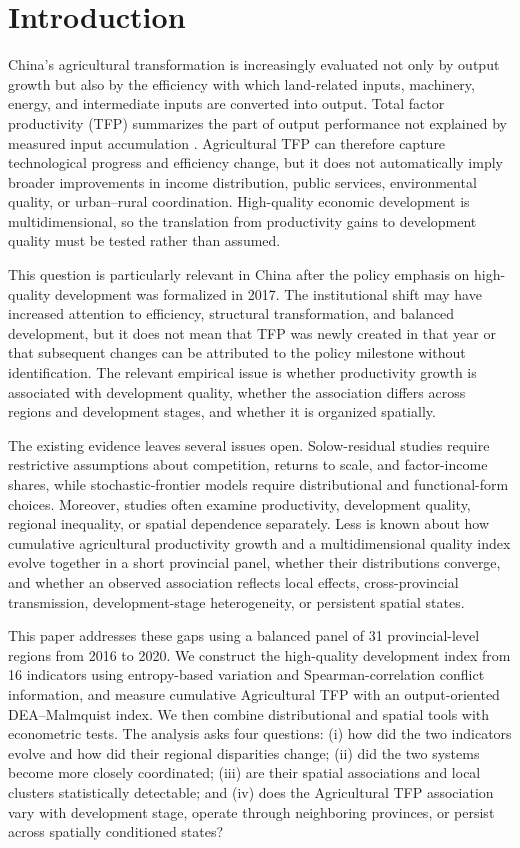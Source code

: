 \documentclass[sustainability,article,submit,moreauthors]{Definitions/mdpi}
\numberwithin{equation}{section}
\begin{document}
\section{Introduction}

China's agricultural transformation is increasingly evaluated not only by output growth but also by the efficiency with which land-related inputs, machinery, energy, and intermediate inputs are converted into output. Total factor productivity (TFP) summarizes the part of output performance not explained by measured input accumulation \cite{liu1999}. Agricultural TFP can therefore capture technological progress and efficiency change, but it does not automatically imply broader improvements in income distribution, public services, environmental quality, or urban--rural coordination. High-quality economic development is multidimensional, so the translation from productivity gains to development quality must be tested rather than assumed.

This question is particularly relevant in China after the policy emphasis on high-quality development was formalized in 2017. The institutional shift may have increased attention to efficiency, structural transformation, and balanced development, but it does not mean that TFP was newly created in that year or that subsequent changes can be attributed to the policy milestone without identification. The relevant empirical issue is whether productivity growth is associated with development quality, whether the association differs across regions and development stages, and whether it is organized spatially.

The existing evidence leaves several issues open. Solow-residual studies require restrictive assumptions about competition, returns to scale, and factor-income shares, while stochastic-frontier models require distributional and functional-form choices. Moreover, studies often examine productivity, development quality, regional inequality, or spatial dependence separately. Less is known about how cumulative agricultural productivity growth and a multidimensional quality index evolve together in a short provincial panel, whether their distributions converge, and whether an observed association reflects local effects, cross-provincial transmission, development-stage heterogeneity, or persistent spatial states.

This paper addresses these gaps using a balanced panel of 31 provincial-level regions from 2016 to 2020. We construct the high-quality development index from 16 indicators using entropy-based variation and Spearman-correlation conflict information, and measure cumulative Agricultural TFP with an output-oriented DEA--Malmquist index. We then combine distributional and spatial tools with econometric tests. The analysis asks four questions: (i) how did the two indicators evolve and how did their regional disparities change; (ii) did the two systems become more closely coordinated; (iii) are their spatial associations and local clusters statistically detectable; and (iv) does the Agricultural TFP association vary with development stage, operate through neighboring provinces, or persist across spatially conditioned states?
\end{document}
